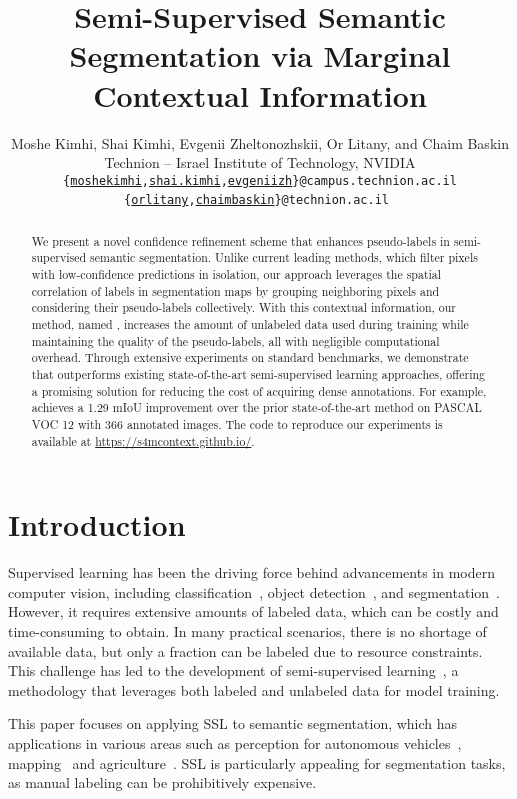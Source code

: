 \documentclass{article}
\title{Semi-Supervised Semantic Segmentation via Marginal Contextual Information}
\author{Moshe Kimhi, Shai Kimhi, Evgenii Zheltonozhskii, Or Litany, and  Chaim Baskin \\
{ Technion -- Israel Institute of Technology, NVIDIA}
\\
{\texttt{\{\href{mailto:moshekimhi@campus.technion.ac.il}{moshekimhi},\href{mailto:shai.kimhi@campus.technion.ac.il}{shai.kimhi},\href{mailto:evgeniizh@campus.technion.ac.il}{evgeniizh}\}@campus.technion.ac.il}}\\ 
{\texttt{\{\href{mailto:orlitany@technion.ac.il}{orlitany},\href{mailto:chaimbaskin@technion.ac.il}{chaimbaskin}\}@technion.ac.il}}\
}
\renewcommand{\cite}[1]{\citep{#1}}
\begin{document}
\maketitle


\begin{abstract}
We present a novel confidence refinement scheme that enhances pseudo-labels in semi-supervised semantic segmentation. Unlike current leading methods, which filter pixels with low-confidence predictions in isolation, our approach leverages the spatial correlation of labels in segmentation maps by grouping neighboring pixels and considering their pseudo-labels collectively. With this contextual information, our method, named \methodname{}, increases the amount of unlabeled data used during training while maintaining the quality of the pseudo-labels, all with negligible computational overhead. Through extensive experiments on standard benchmarks, we demonstrate that \methodname{} outperforms existing state-of-the-art semi-supervised learning approaches, offering a promising solution for reducing the cost of acquiring dense annotations. For example, \methodname{} achieves a  1.29 mIoU improvement over the prior state-of-the-art method on PASCAL VOC 12 with 366 annotated images. The code to reproduce our experiments is available at \url{https://s4mcontext.github.io/}.
\end{abstract}


\section{Introduction}\label{sec:intro}

Supervised learning has been the driving force behind advancements in modern computer vision, including classification~\cite{krizhevsky2012alexnet,dai2021coatnet}, object detection~\cite{girshick2015rcnn,zong2022detrs}, and segmentation~\cite{zagoruyko2016multipath,deeplab,li2022mask,kirillov2023segment}. 
However, it requires extensive amounts of labeled data, which can be costly and time-consuming to obtain. In many practical scenarios, there is no shortage of available data, but only a fraction can be labeled due to resource constraints. This challenge has led to the development of semi-supervised learning~\citep[SSL;][]{rasmus2015semisupervised,berthelot2019mixmatch,sohn2020fixmatch,yang2022ccssl}, a methodology that leverages both labeled and unlabeled data for model training.

This paper focuses on applying SSL to semantic segmentation, which has applications in various areas such as perception for autonomous vehicles~\cite{bartolomei2020semanticpalnning}, mapping~\cite{etten2018spacenet} and agriculture~\cite{milioto2018precisionagriculture}. SSL is particularly appealing for segmentation tasks, as manual labeling can be prohibitively expensive.
\end{document}

